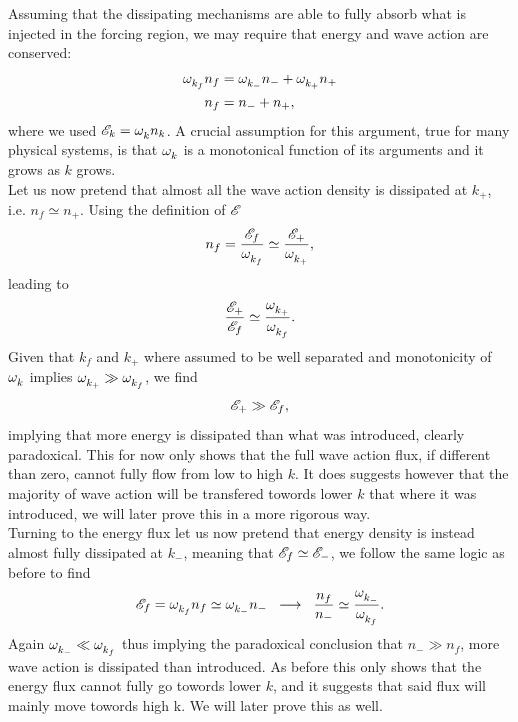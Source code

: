 Assuming that the dissipating mechanisms are able to fully absorb what is injected in the forcing region, we may require that energy and wave action are conserved:
\begin{align}
    \omega^{}_{k_f}n_f &=  \omega^{}_{k_-}n_- + \omega^{}_{k_+}n_+ \\
    n_f &= n_- + n_+,
\end{align}
where we used $\mathscr{E}_k = \omega^{}_k n_k$. A crucial assumption for this argument, true for many physical systems, is that $\omega^{}_k$ is a monotonical function 
of its arguments and it grows as $k$ grows.\\
Let us now pretend that almost all the wave action density is dissipated at $k_+$, i.e. $n_f \simeq n_+$. Using the definition of $\mathscr{E}$ 
\begin{equation}
    n_f = \frac{\mathscr{E}_f}{\omega^{}_{k_f}} \simeq \frac{\mathscr{E}_+}{\omega^{}_{k_+}},
\end{equation}
leading to 
\begin{equation}
    \frac{\mathscr{E}_+}{\mathscr{E}_f} \simeq \frac{\omega^{}_{k_+}}{\omega^{}_{k_f}}.
\end{equation}
Given that $k_f$ and $k_+$ where assumed to be well separated and monotonicity of $\omega^{}_k$ implies $\omega^{}_{k_+} \gg \omega^{}_{k_f}$, we find 
\begin{equation}
    \mathscr{E}_+ \gg \mathscr{E}_f,
\end{equation}
implying that more energy is dissipated than what was introduced, clearly paradoxical. This for now only shows that the full wave action flux, if different than zero, cannot 
fully flow from low to high $k$. It does suggests however that the majority of wave action will be transfered towords lower $k$ that where it was introduced, we will 
later prove this in a more rigorous way. \\
Turning to the energy flux let us now pretend that energy density is instead almost fully dissipated at $k_-$, meaning that $\mathscr{E}_f \simeq \mathscr{E}_-$, we follow the same 
logic as before to find
\begin{equation}
    \mathscr{E}_f = \omega^{}_{k_f}n_f \simeq \omega^{}_{k_-}n_- \hspace{2mm} \longrightarrow \hspace{2mm} \frac{n_f}{n_-} \simeq \frac{\omega^{}_{k_-}}{\omega^{}_{k_f}}.
\end{equation}   
Again $\omega^{}_{k_-} \ll \omega^{}_{k_f}$ thus implying the paradoxical conclusion that $n_- \gg n_f$, more wave action is dissipated than introduced. As before this only 
shows that the energy flux cannot fully go towords lower $k$, and it suggests that said flux will mainly move towords high k. We will later prove this as well. \\
